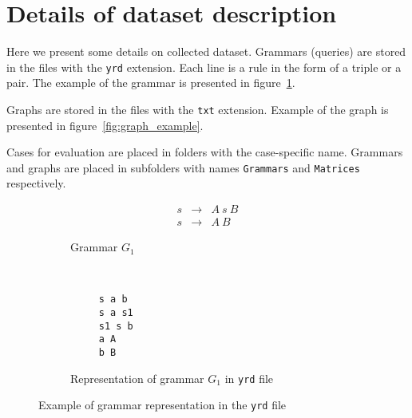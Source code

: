 \section{Details of dataset description}

Here we present some details on collected dataset.
Grammars (queries) are stored in the files with the \verb|yrd| extension.
Each line is a rule in the form of a triple or a pair.
The example of the grammar is presented in figure~\ref{fig:grammar_example}.

Graphs are stored in the files with the \verb|txt| extension.
Example of the graph is presented in figure~\ref{fig:graph_example}.

Cases for evaluation are placed in folders with the case-specific name.
Grammars and graphs are placed in subfolders with names \verb|Grammars| and \verb|Matrices| respectively.

\begin{figure}[h]
    \centering
    \begin{subfigure}[b]{0.24\textwidth}
        \centering
        \[
         \begin{array}{rcl}
           s & \rightarrow & A \ s \ B \\
           s & \rightarrow & A \ B
         \end{array}
         \]
        \caption{Grammar $G_1$}
    \end{subfigure}%
    ~
    \begin{subfigure}[b]{0.24\textwidth}
        \centering
        \begin{verbatim}
     s a b
     s a s1
     s1 s b
     a A
     b B
        \end{verbatim}
        \caption{Representation of grammar $G_1$ in \texttt{yrd} file}
    \end{subfigure}
    \caption{Example of grammar representation in the \texttt{yrd} file}
    \label{fig:grammar_example}
\end{figure}


